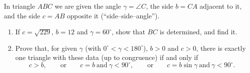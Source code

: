 In triangle $ABC$ we are given the angle $\gamma=\angle C$, the side $b=CA$ adjacent to it, and the side $c=AB$ opposite it (``side--side--angle'').
\begin{enumerate}
\item[(a)] If $c=\sqrt{229}$, $b=12$ and $\gamma=60^\circ$, show that $BC$ is determined, and find it.
\item[(b)] Prove that, for given $\gamma$ (with $0^\circ<\gamma<180^\circ$), $b>0$ and $c>0$, there is exactly one triangle with these data (up to congruence) if and only if
\[c>b,\qquad\text{or}\qquad c=b\ \text{and}\ \gamma<90^\circ,\qquad\text{or}\qquad c=b\sin\gamma\ \text{and}\ \gamma<90^\circ.\]
\end{enumerate}
